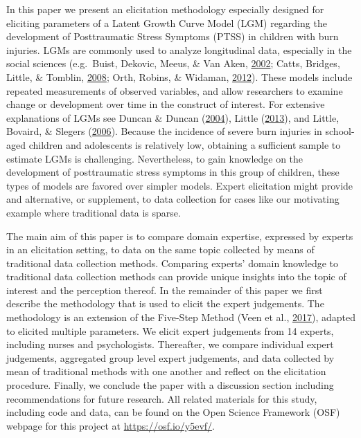 \documentclass[openright,titlepage,12pt,a4paper]{book}
\begin{document}
In this paper we present an elicitation methodology especially designed for eliciting parameters of a Latent Growth Curve Model (LGM) regarding the development of Posttraumatic Stress Symptoms (PTSS) in children with burn injuries. LGMs are commonly used to analyze longitudinal data, especially in the social sciences (e.g.~Buist, Dekovic, Meeus, \& Van Aken, \protect\hyperlink{ref-buist_developmental_2002}{2002}; Catts, Bridges, Little, \& Tomblin, \protect\hyperlink{ref-catts_reading_2008}{2008}; Orth, Robins, \& Widaman, \protect\hyperlink{ref-orth_life-span_2012}{2012}). These models include repeated measurements of observed variables, and allow researchers to examine change or development over time in the construct of interest. For extensive explanations of LGMs see Duncan \& Duncan (\protect\hyperlink{ref-duncan_introduction_2004}{2004}), Little (\protect\hyperlink{ref-little_longitudinal_2013}{2013}), and Little, Bovaird, \& Slegers (\protect\hyperlink{ref-little_methods_2006}{2006}). Because the incidence of severe burn injuries in school-aged children and adolescents is relatively low, obtaining a sufficient sample to estimate LGMs is challenging. Nevertheless, to gain knowledge on the development of posttraumatic stress symptoms in this group of children, these types of models are favored over simpler models. Expert elicitation might provide and alternative, or supplement, to data collection for cases like our motivating example where traditional data is sparse.

The main aim of this paper is to compare domain expertise, expressed by experts in an elicitation setting, to data on the same topic collected by means of traditional data collection methods. Comparing experts' domain knowledge to traditional data collection methods can provide unique insights into the topic of interest and the perception thereof. In the remainder of this paper we first describe the methodology that is used to elicit the expert judgements. The methodology is an extension of the Five-Step Method (Veen et al., \protect\hyperlink{ref-veen_proposal_2017}{2017}), adapted to elicited multiple parameters. We elicit expert judgements from 14 experts, including nurses and psychologists. Thereafter, we compare individual expert judgements, aggregated group level expert judgements, and data collected by mean of traditional methods with one another and reflect on the elicitation procedure. Finally, we conclude the paper with a discussion section including recommendations for future research. All related materials for this study, including code and data, can be found on the Open Science Framework (OSF) webpage for this project at \url{https://osf.io/y5evf/}.
\end{document}
